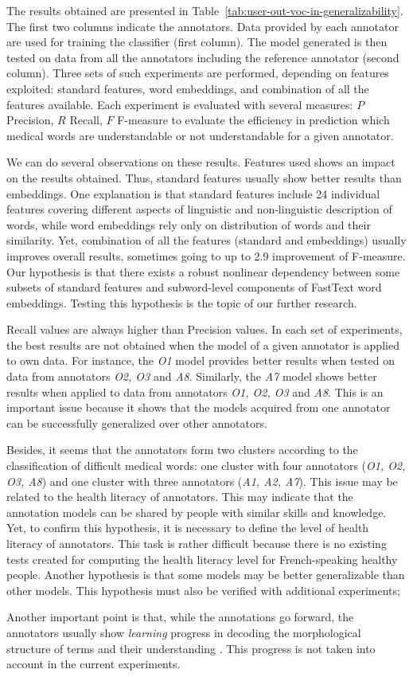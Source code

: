The results obtained are presented in
Table~\ref{tab:user-out-voc-in-generalizability}. The first two columns indicate the
annotators.
Data provided by each annotator are used for training the classifier
(first column). The model generated is then tested on data from all
the annotators including the reference annotator (second column).
Three sets of such experiments are performed, depending on features
exploited: standard features, word embeddings, and combination of all
the features available.
Each experiment is evaluated with several measures: $P$ Precision, $R$
Recall, $F$ F-measure to evaluate the efficiency in prediction which
medical words are understandable or not understandable for a given
annotator.

We can do several observations on these results.
Features used shows an impact on the results obtained. Thus, standard
features usually show better results than embeddings. One explanation
is that standard features include 24 individual features covering
different aspects of linguistic and non-linguistic description of
words, while word embeddings rely only on distribution of words and
their similarity. Yet, combination of all the features (standard and
embeddings) usually improves overall results, sometimes going to up to
2.9 improvement of F-measure.  Our hypothesis is that there exists a
robust nonlinear dependency between some subsets of standard features
and subword-level components of FastText word embeddings. Testing this
hypothesis is the topic of our further research.

Recall values are always higher than Precision values.
In each set of experiments, the best results are not obtained when the
model of a given annotator is applied to own data. For instance, the
{\it O1} model provides better results when tested on data from
annotators {\it O2, O3} and {\it A8}.  Similarly, the {\it A7} model
shows better results when applied to data from annotators {\it O1, O2,
  O3} and {\it A8}. This is an important issue because it shows that
the models acquired from one annotator can be successfully generalized
over other annotators.

Besides, it seems that the annotators form two clusters according to
the classification of difficult medical words: one cluster with four
annotators ({\it O1, O2, O3, A8}) and one cluster with three
annotators ({\it A1, A2, A7}). This issue may be related to the health
literacy of annotators. This may indicate that the annotation models
can be shared by people with similar skills and knowledge. Yet, to
confirm this hypothesis, it is necessary to define the level of health
literacy of annotators. This task is rather difficult because there is
no existing tests created for computing the health literacy level for
French-speaking healthy people. Another hypothesis is that some models
may be better generalizable than other models. This hypothesis must
also be verified with additional experiments;

Another important point is that, while the annotations go forward, the
annotators usually show {\it learning} progress in decoding the
morphological structure of terms and their understanding
\citep{Grabar-BIONLP2017}. This progress is not taken into account in
the current experiments.